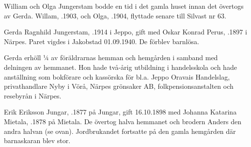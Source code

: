 William och Olga Jungerstam bodde en tid i det gamla huset innan det övertogs av Gerda. Willam, .1903, och Olga, .1904, flyttade senare till Silvast nr 63.



%
Gerda Ragnhild Jungerstam, .1914 i Jeppo, gift med Oskar Konrad Perus, .1897 i Närpes. Paret vigdes i Jakobstad 01.09.1940. De förblev barnlösa.

Gerda erhöll ¼ av föräldrarnas hemman och hemgården i samband med delningen av hemmanet. Hon hade två-årig utbildning i handelsskola och hade anställning som bokförare och kassörska för bl.a. Jeppo Oravais Handelslag, privathandlare Nyby i Vörå, Närpes grönsaker AB, folkpensionsanstalten och resebyrån i Närpes.


%
Erik Eriksson Jungar, .1877 på Jungar, gift 16.10.1898 med Johanna Katarina Mietala, .1878 på Mietala. De övertog halva hemmanet och brodern Anders den andra halvan (se ovan). Jordbrukandet fortsatte på den gamla hemgården där barnaskaran blev stor.
\begin{jhchildren}
  \item {}
  \item {}
  \item {}
  \item {}
  \item {}
  \item {}
  \item {}
  \item {}
  \item {}
  \item {}
\end{jhchildren}


